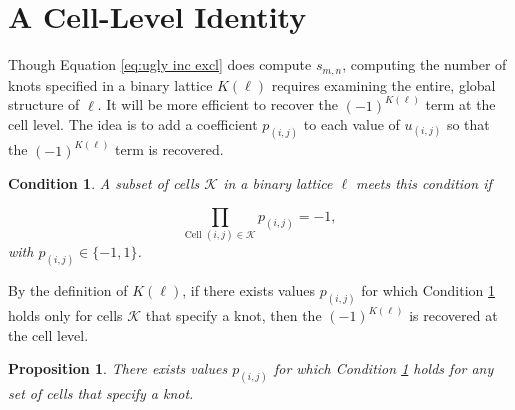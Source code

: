 \documentclass[12pt]{article}
\theoremstyle{plain}
\newtheorem{prop}[thm]{Proposition}
\newtheorem{condition}[thm]{Condition}
\theoremstyle{definition}
\theoremstyle{remark}
\theoremstyle{definition}
\begin{document}
\section{A Cell-Level Identity}

Though Equation \ref{eq:ugly inc excl} does compute $s_{m,n}$, computing the number of knots specified in a binary lattice $K(\ell)$ requires examining the entire, global structure of $\ell$. It will be more efficient to recover the $(-1)^{K(\ell)}$ term at the cell level. The idea is to add a coefficient $p_{(i,j)}$ to each value of $u_{(i,j)}$ so that the $(-1)^{K(\ell)}$ term is recovered.

\begin{condition}
    A subset of cells $\mathcal{K}$ in a binary lattice $\ell$ meets this condition if
    
    \begin{equation}
        \prod_{\text{Cell } (i,j) \in \mathcal{K}} p_{(i,j)} = -1,
        \label{eq:neg prod knot condition}
    \end{equation}
    with $p_{(i,j)} \in \{-1,1\}$.
    \label{cond:neg prod condition}
\end{condition}

By the definition of $K(\ell)$, if there exists values $p_{(i,j)}$ for which Condition \ref{cond:neg prod condition} holds only for cells $\mathcal{K}$ that specify a knot, then the $(-1)^{K(\ell)}$ is recovered at the cell level.

\begin{prop}
    There exists values $p_{(i,j)}$ for which Condition \ref{cond:neg prod condition} holds for any set of cells that specify a knot.
    \label{prop:neg prod prop}
\end{prop}
\end{document}
